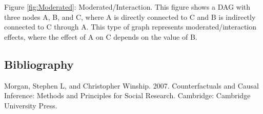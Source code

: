 \documentclass[twocolumn]{article} %
\begin{document}
Figure \ref{fig:Moderated}: Moderated/Interaction. This figure shows a DAG with three nodes A, B, and C, where A is directly connected to C and B is indirectly connected to C through A. This type of graph represents moderated/interaction effects, where the effect of A on C depends on the value of B.
    
\subsection*{Bibliography}
Morgan, Stephen L, and Christopher Winship. 2007. Counterfactuals and Causal Inference: Methods and Principles for Social Research. Cambridge: Cambridge University Press.


\end{document}
